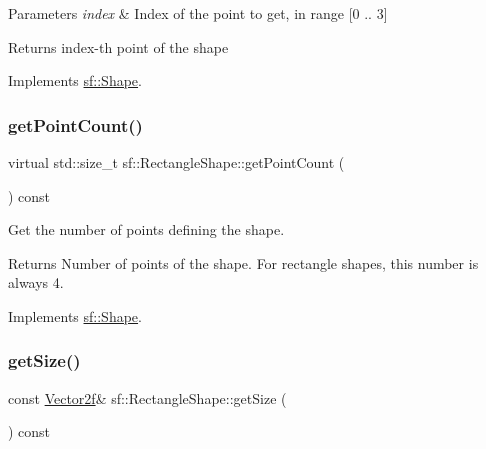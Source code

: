 \begin{DoxyParams}{Parameters}
{\em index} & Index of the point to get, in range \mbox{[}0 .. 3\mbox{]}\\
\hline
\end{DoxyParams}
\begin{DoxyReturn}{Returns}
index-\/th point of the shape \begin{DoxyVerb}\end{DoxyVerb}
 
\end{DoxyReturn}


Implements \mbox{\hyperlink{classsf_1_1_shape_a40e5d83713eb9f0c999944cf96458085}{sf\+::\+Shape}}.

\mbox{\label{classsf_1_1_rectangle_shape_adfb2f429e5720c9ccdb26d5996c3ae33}} 
\subsubsection{\texorpdfstring{getPointCount()}{getPointCount()}}
{\footnotesize\ttfamily virtual std\+::size\+\_\+t sf\+::\+Rectangle\+Shape\+::get\+Point\+Count (\begin{DoxyParamCaption}{ }\end{DoxyParamCaption}) const\hspace{0.3cm}{\ttfamily [virtual]}}



Get the number of points defining the shape. 

\begin{DoxyReturn}{Returns}
Number of points of the shape. For rectangle shapes, this number is always 4. \begin{DoxyVerb}\end{DoxyVerb}
 
\end{DoxyReturn}


Implements \mbox{\hyperlink{classsf_1_1_shape_af988dd61a29803fc04d02198e44b5643}{sf\+::\+Shape}}.

\mbox{\label{classsf_1_1_rectangle_shape_ae54a07ff5537bf76de6748f592b34896}} 
\subsubsection{\texorpdfstring{getSize()}{getSize()}}
{\footnotesize\ttfamily const \mbox{\hyperlink{classsf_1_1_vector2}{Vector2f}}\& sf\+::\+Rectangle\+Shape\+::get\+Size (\begin{DoxyParamCaption}{ }\end{DoxyParamCaption}) const}



